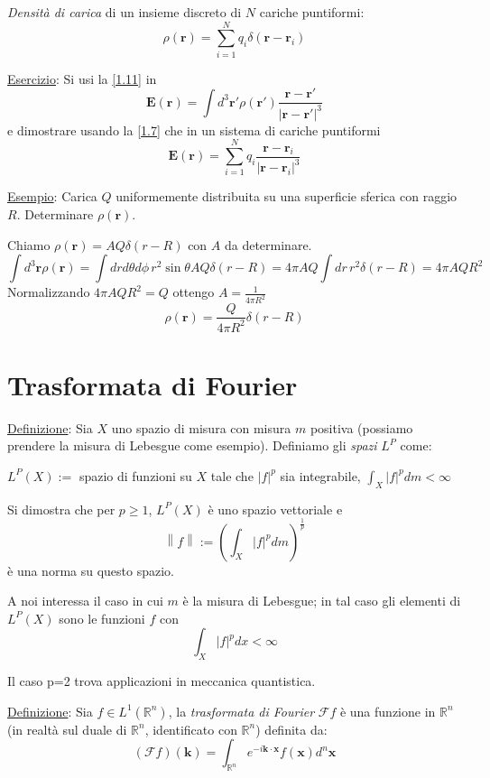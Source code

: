 \documentclass[a4paper,11pt]{report}
\newcommand{\vect}[1]{\boldsymbol{#1}}
\newcommand{\R}{\mathbb{R}}
\newcommand{\Rn}{\mathbb{R}^n}
\begin{document}
\medskip

\emph{Densit\`a di carica} di un insieme discreto di $N$ cariche puntiformi:
\begin{equation}
\rho(\vect{r}) = \sum_{i=1}^{N} q_i\delta(\vect{r}-\vect{r}_i)
\label{1.11}
\end{equation}

\underline{Esercizio}: Si usi la \eqref{1.11} in
\[
\vect{E}(\vect{r})=\int d^3\vect{r}'\rho(\vect{r}')\frac{\vect{r}-\vect{r}'}{|\vect{r}-\vect{r}'|^3}
\]
e dimostrare usando la \eqref{1.7} che in un sistema di cariche puntiformi
\[
\vect{E}(\vect{r})= \sum_{i=1}^{N} q_i\frac{\vect{r}-\vect{r}_i}{|\vect{r}-\vect{r}_i|^3}
\]

\underline{Esempio}: Carica $Q$ uniformemente distribuita su una superficie sferica con raggio $R$. 
Determinare $\rho(\vect{r})$.

Chiamo $\rho(\vect{r})=A Q\delta(r-R)$ con $A$ da determinare.
\[
\int d^3\vect{r}\rho(\vect{r})= \int dr d\theta d\phi \, r^2 \sin\theta  A Q \delta(r-R) = 4\pi AQ \int dr \, r^2 \delta(r-R)=4\pi AQR^2
\]
Normalizzando $4\pi AQR^2 =Q$ ottengo $A=\frac{1}{4\pi R^2}$
\[
\rho(\vect{r})=\frac{Q}{4\pi R^2}\delta(r-R)
\]

\section{Trasformata di Fourier}

\underline{Definizione}: 
Sia $X$ uno spazio di misura con misura $m$ positiva (possiamo prendere la misura di Lebesgue come esempio).
Definiamo gli \emph{spazi} $L^P$ come:

$L^P(X):=$ spazio di funzioni su $X$ tale che $|f|^p$ sia integrabile, $\int_{X}|f|^p dm < \infty$

Si dimostra che per $p\geq1$, $L^P(X)$ \`e uno spazio vettoriale e 
\[
\left\|f\right\| := \left( \int_{X} |f|^p dm\right)^{\frac{1}{p}}
\]
\`e una norma su questo spazio.

A noi interessa il caso in cui $m$ \`e la misura di Lebesgue; in tal caso gli elementi di $L^P(X)$ sono le funzioni $f$ con 
\[
\int_{X}|f|^p dx < \infty
\]

Il caso p=2 trova applicazioni in meccanica quantistica.

\medskip

\underline{Definizione}: Sia $f\in L^1 (\Rn)$, la \emph{trasformata di Fourier} $\mathcal{F}f$ \`e una funzione in $\Rn$ (in realt\`a sul duale di $\R^n$, identificato con $\R^n$) definita da:
\begin{equation}
\left( \mathcal{F} f\right)(\vect{k}) = \int_{\Rn}e^{-i\vect{k}\cdot\vect{x}}f(\vect{x})d^n\vect{x} 
\end{equation}
\end{document}
